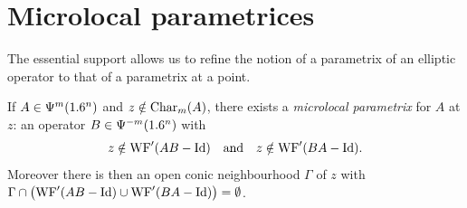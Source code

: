 \section{Microlocal parametrices}\label{microlocal:sec:parametrix}

The essential support allows us to refine the notion of a parametrix of an
elliptic operator to that of a parametrix at a point.

\begin{proposition}\label{microlocal:prop:parametrix}
  If $A\in\Psi^{m}(1.6^n)$ and $z\notin\operatorname{Char}_m(A)$, there exists a
  \emph{microlocal parametrix} for $A$ at $z$: an operator
  $B\in\Psi^{-m}(1.6^n)$ with
  \begin{equation*}
    z\notin\operatorname{WF}'(AB-\operatorname{Id})\quad\text{and}\quad z\notin\operatorname{WF}'(BA-\operatorname{Id}).
  \end{equation*}
  Moreover there is then an open conic neighbourhood $\Gamma$ of $z$ with
  $\Gamma\cap\bigl(\operatorname{WF}'(AB-\operatorname{Id})\cup\operatorname{WF}'(BA-\operatorname{Id})\bigr)=\emptyset$.
\end{proposition}
